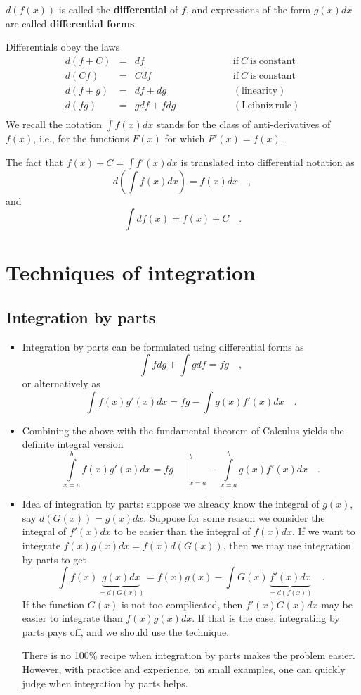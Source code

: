 \documentclass[12pt]{book}
\newcommand{\importantFormula}[1]{\begin{equation} \boxed{#1} \end{equation}}
\renewcommand{\emph}{\textbf}
\begin{document}
$d(f(x))$ is called the \emph{differential} of $f$, and expressions of the form $g(x)dx$ are called \emph{differential forms}.

Differentials obey the laws
\[
\begin{array}{rcll}
d(f+C)&=&df \quad \quad &\mathrm{if~} C \mathrm{~is~constant}\\
d(Cf)&=&Cdf \quad \quad &\mathrm{if~} C \mathrm{~is~constant}\\
d(f+g)&=&df+dg \quad\quad\quad\quad \quad &(\mathrm{linearity})\\
d(fg)&=&gdf+fdg \quad\quad\quad\quad \quad &(\mathrm{Leibniz~rule})\\
\end{array}
\]
We recall the notation $\int f(x)dx$ stands for the class of anti-derivatives of $f(x)$, i.e., for the functions $F(x)$ for which $F'(x) = f(x)$.

The fact that $f(x)+C=\int f'(x)dx$ is translated into differential notation as 
\importantFormula{
d \left(\int f(x)dx\right)= f(x)dx\quad ,
}
and
\importantFormula{
\int df(x)= f(x)+C\quad .
}
\section{Techniques of integration}
\subsection{Integration by parts}
\begin{itemize}
\item Integration by parts can be formulated using differential forms as
\importantFormula{
\int f dg+ \int g df = fg\quad, 
}
or alternatively as
\importantFormula{
\int f(x) g'(x)dx = fg- \int g(x) f'(x)dx \quad .
}
\item  Combining the above with the fundamental theorem of Calculus yields the definite integral version
\importantFormula{
\int\limits_{x=a}^{b} f(x) g'(x)dx = \left.fg\phantom\int\right|_{x=a}^b - \int\limits_{x=a}^b g(x) f'(x)dx \quad.
}
\item Idea of integration by parts: suppose we already know the integral of $g(x)$, say $d(G(x))=g(x)dx$. Suppose for some reason we consider the integral of $f'(x)dx$ to be easier than the integral of $f(x)dx$. If we want to integrate $f(x)g(x)dx= f(x)d(G(x))$, then we may use integration by parts to get
\[
\int f(x)\underbrace{g(x)dx}_{=d(G(x))}= f(x)g(x)- \int G(x) \underbrace{f'(x)dx}_{=d(f(x))}\quad .
\]
If the function $G(x)$ is not too complicated, then $f'(x)G(x)dx$ may be easier to integrate than $f(x)g(x)dx$. If that is the case, integrating by parts pays off, and we should use the technique. 

There is no 100\% recipe when integration by parts makes the problem easier. However, with practice and experience, on small examples, one can quickly judge when integration by parts helps.
\end{itemize}
\end{document}

